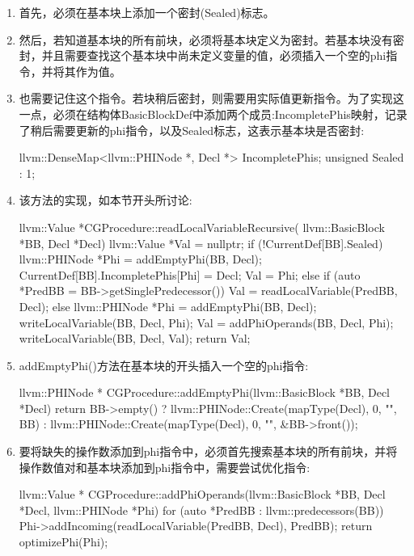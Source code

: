 \begin{enumerate}
\item
首先，必须在基本块上添加一个密封(Sealed)标志。

\item
然后，若知道基本块的所有前块，必须将基本块定义为密封。若基本块没有密封，并且需要查找这个基本块中尚未定义变量的值，必须插入一个空的phi指令，并将其作为值。

\item
也需要记住这个指令。若块稍后密封，则需要用实际值更新指令。为了实现这一点，必须在结构体BasicBlockDef中添加两个成员:IncompletePhis映射，记录了稍后需要更新的phi指令，以及Sealed标志，这表示基本块是否密封:

\begin{cpp}
llvm::DenseMap<llvm::PHINode *, Decl *> IncompletePhis;
unsigned Sealed : 1;
\end{cpp}

\item
该方法的实现，如本节开头所讨论:

\begin{cpp}
llvm::Value *CGProcedure::readLocalVariableRecursive(
        llvm::BasicBlock *BB, Decl *Decl) {
    llvm::Value *Val = nullptr;
    if (!CurrentDef[BB].Sealed) {
        llvm::PHINode *Phi = addEmptyPhi(BB, Decl);
        CurrentDef[BB].IncompletePhis[Phi] = Decl;
        Val = Phi;
    } else if (auto *PredBB = BB->getSinglePredecessor()) {
        Val = readLocalVariable(PredBB, Decl);
    } else {
        llvm::PHINode *Phi = addEmptyPhi(BB, Decl);
        writeLocalVariable(BB, Decl, Phi);
        Val = addPhiOperands(BB, Decl, Phi);
    }
    writeLocalVariable(BB, Decl, Val);
    return Val;
}
\end{cpp}

\item
addEmptyPhi()方法在基本块的开头插入一个空的phi指令:

\begin{cpp}
llvm::PHINode *
CGProcedure::addEmptyPhi(llvm::BasicBlock *BB,
        Decl *Decl) {
    return BB->empty()
        ? llvm::PHINode::Create(mapType(Decl), 0,
                                "", BB)
        : llvm::PHINode::Create(mapType(Decl), 0,
                                "", &BB->front());
}
\end{cpp}

\item
要将缺失的操作数添加到phi指令中，必须首先搜索基本块的所有前块，并将操作数值对和基本块添加到phi指令中，需要尝试优化指令:

\begin{cpp}
llvm::Value *
CGProcedure::addPhiOperands(llvm::BasicBlock *BB,
                            Decl *Decl,
                            llvm::PHINode *Phi) {
    for (auto *PredBB : llvm::predecessors(BB))
        Phi->addIncoming(readLocalVariable(PredBB, Decl),
                         PredBB);
    return optimizePhi(Phi);
}
\end{cpp}

\end{enumerate}

